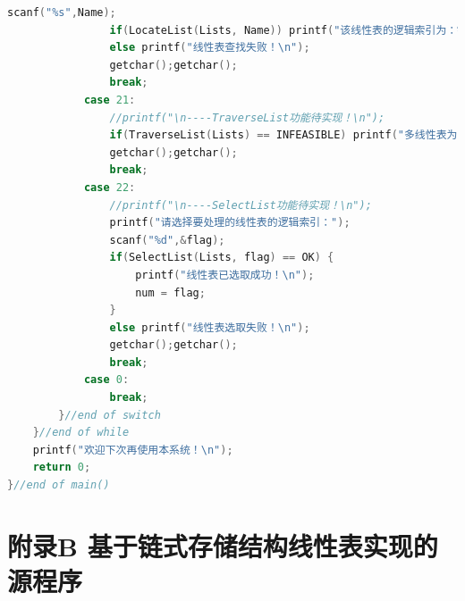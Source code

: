\documentclass[supercite]{Experimental_Report}
\theoremstyle{definition}
\begin{document}
\begin{lstlisting}[language=c]
                scanf("%s",Name);
                if(LocateList(Lists, Name)) printf("该线性表的逻辑索引为：%d\n", LocateList(Lists, Name));
                else printf("线性表查找失败！\n");
                getchar();getchar();
                break;
            case 21:
                //printf("\n----TraverseList功能待实现！\n");
                if(TraverseList(Lists) == INFEASIBLE) printf("多线性表为空！\n");
                getchar();getchar();
                break;
            case 22:
                //printf("\n----SelectList功能待实现！\n");
                printf("请选择要处理的线性表的逻辑索引：");
                scanf("%d",&flag);
                if(SelectList(Lists, flag) == OK) {
                	printf("线性表已选取成功！\n");
                	num = flag;
				}
                else printf("线性表选取失败！\n");
                getchar();getchar();
                break;
            case 0: 
                break;
        }//end of switch
    }//end of while
    printf("欢迎下次再使用本系统！\n");
    return 0;
}//end of main()

\end{lstlisting}

\newpage
\section{附录B 基于链式存储结构线性表实现的源程序}
\end{document}

